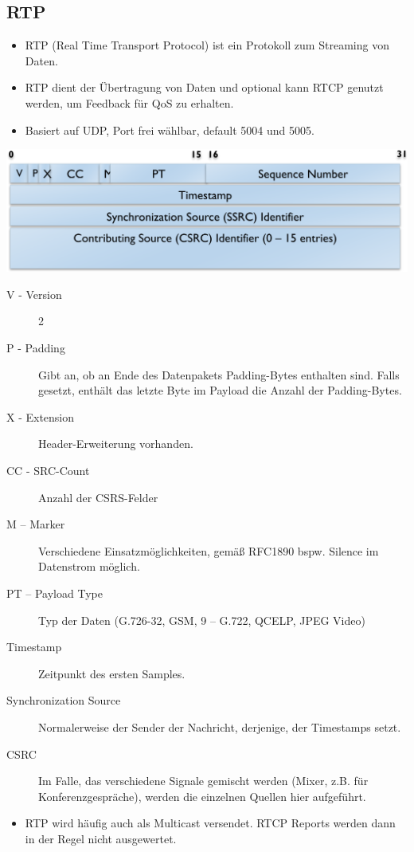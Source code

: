 \documentclass{article} %
\begin{document}
\subsection{RTP}
	\begin{itemize}
	\item RTP (Real Time Transport Protocol) ist ein Protokoll zum Streaming von Daten. 
	\item RTP dient der Übertragung von Daten und optional kann RTCP genutzt werden, um Feedback für QoS zu erhalten.
	\item Basiert auf UDP, Port frei wählbar, default 5004 und 5005. 
	\end{itemize}	
	\begin{center}
		\includegraphics[width=14cm]{img/rtp.png}
	\end{center}
	\begin{description}
	\item[V - Version] 2
	\item[P - Padding] Gibt an, ob an Ende des Datenpakets Padding-Bytes enthalten sind. Falls gesetzt, enthält das letzte Byte im Payload die Anzahl 	der Padding-Bytes. 
	\item[X - Extension] Header-Erweiterung vorhanden.
	\item[CC - SRC-Count] Anzahl der CSRS-Felder
	\item[M – Marker] Verschiedene Einsatzmöglichkeiten, gemäß RFC1890 bspw. 
		\glqq Silence im Datenstrom möglich\grqq. 
	\item[PT – Payload Type] Typ der Daten (G.726-32, GSM, 9 – G.722, QCELP, JPEG Video)
	\item[Timestamp] Zeitpunkt des ersten Samples. 
	\item[Synchronization Source ] Normalerweise der Sender der Nachricht, derjenige, der Timestamps setzt. 
	\item[CSRC] Im Falle, das verschiedene Signale gemischt werden (Mixer, z.B. für Konferenzgespräche), werden die einzelnen Quellen hier aufgeführt. 
	\end{description}
	\begin{itemize}
	\item RTP wird häufig auch als Multicast versendet. RTCP Reports werden dann in der Regel nicht ausgewertet. 
	\end{itemize}
	
\end{document}
